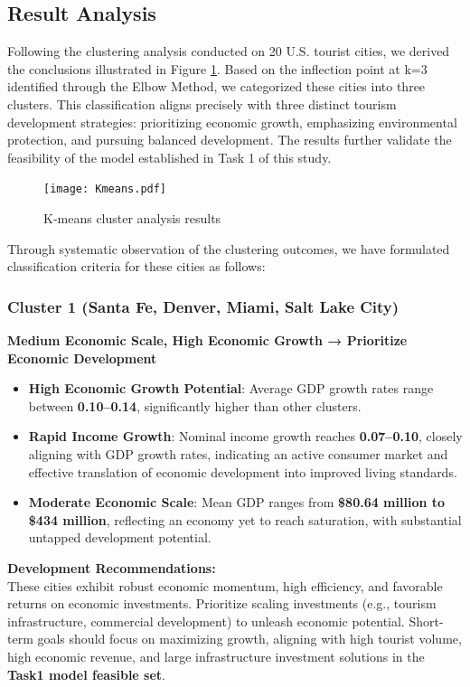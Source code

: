 \documentclass{mcmthesis}
\begin{document}
\subsection{Result Analysis}
Following the clustering analysis conducted on 20 U.S. tourist cities, we derived the conclusions illustrated in Figure \ref{fig:kmeansresult}. Based on the inflection point at k=3 identified through the Elbow Method, we categorized these cities into three clusters. This classification aligns precisely with three distinct tourism development strategies: prioritizing economic growth, emphasizing environmental protection, and pursuing balanced development. The results further validate the feasibility of the model established in Task 1 of this study.\par
\begin{figure}[h]
\centering
  \texttt{[image: Kmeans.pdf]}
  \caption{K-means cluster analysis results}
  \label{fig:kmeansresult}
\end{figure}
Through systematic observation of the clustering outcomes, we have formulated classification criteria for these cities as follows:\par
\subsubsection*{Cluster 1 (Santa Fe, Denver, Miami, Salt Lake City)}
\textbf{Medium Economic Scale, High Economic Growth → Prioritize Economic Development}
\begin{itemize}
    \item \textbf{High Economic Growth Potential}: Average GDP growth rates range between \textbf{0.10--0.14}, significantly higher than other clusters.
    \item \textbf{Rapid Income Growth}: Nominal income growth reaches \textbf{0.07--0.10}, closely aligning with GDP growth rates, indicating an active consumer market and effective translation of economic development into improved living standards.
    \item \textbf{Moderate Economic Scale}: Mean GDP ranges from \textbf{\$80.64 million to \$434 million}, reflecting an economy yet to reach saturation, with substantial untapped development potential.
\end{itemize}

\textbf{Development Recommendations:} \\
These cities exhibit robust economic momentum, high efficiency, and favorable returns on economic investments. Prioritize scaling investments (e.g., tourism infrastructure, commercial development) to unleash economic potential. Short-term goals should focus on maximizing growth, aligning with high tourist volume, high economic revenue, and large infrastructure investment solutions in the \textbf{Task1 model feasible set}.
\end{document}
